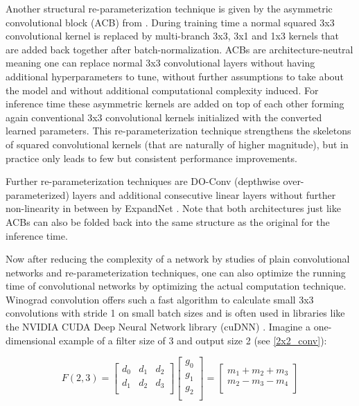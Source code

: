 Another structural re-parameterization technique is given by the asymmetric convolutional block (ACB) from \cite{XiaohanDing.2019}. During training time a normal squared 3x3 convolutional kernel is replaced by multi-branch 3x3, 3x1 and 1x3 kernels that are added back together after batch-normalization. ACBs are architecture-neutral meaning one can replace normal 3x3 convolutional layers without having additional hyperparameters to tune, without further assumptions to take about the model and without additional computational complexity induced. For inference time these asymmetric kernels are added on top of each other forming again conventional 3x3 convolutional kernels initialized with the converted learned parameters. This re-parameterization technique strengthens the skeletons of squared convolutional kernels (that are naturally of higher magnitude), but in practice only leads to few but consistent performance improvements. \cite{XiaohanDing.2019}

Further re-parameterization techniques are DO-Conv (depthwise over-parameterized) layers \cite{JinmingCao.2020} and additional consecutive linear layers without further non-linearity in between by ExpandNet \cite{ShuxuanGuo.2021}. Note that both architectures just like ACBs can also be folded back into the same structure as the original for the inference time. 

Now after reducing the complexity of a network by studies of plain convolutional networks and re-parameterization techniques, one can also optimize the running time of convolutional networks by optimizing the actual computation technique. Winograd convolution offers such a fast algorithm to calculate small 3x3 convolutions with stride 1 on small batch sizes and is often used in libraries like the NVIDIA CUDA Deep Neural Network library (cuDNN) \cite{SharanChetlur.2014}. Imagine a one-dimensional example of a filter size of 3 and output size 2 (see \autoref{2x2_conv}):

\begin{equation} \label{2x2_conv}
	F(2,3) = \begin{bmatrix}
		d_0 & d_1 & d_2 \\
		d_1 & d_2 & d_3 \\
	\end{bmatrix} \begin{bmatrix}
		g_0 \\
		g_1 \\
		g_2 \\
	\end{bmatrix} = \begin{bmatrix}
		m_1 + m_2 + m_3 \\
		m_2 - m_3 - m_4 \\
	\end{bmatrix}
\end{equation}


